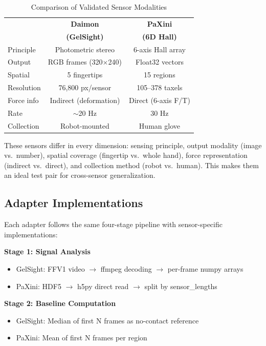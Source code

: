 \documentclass[conference]{IEEEtran}
\begin{document}
\begin{table}[t]
\centering
\caption{Comparison of Validated Sensor Modalities}
\label{tab:sensors}
\begin{tabular}{lcc}
\toprule
& \textbf{Daimon} & \textbf{PaXini} \\
& \textbf{(GelSight)} & \textbf{(6D Hall)} \\
\midrule
Principle & Photometric stereo & 6-axis Hall array \\
Output & RGB frames (320$\times$240) & Float32 vectors \\
Spatial & 5 fingertips & 15 regions \\
Resolution & 76,800 px/sensor & 105--378 taxels \\
Force info & Indirect (deformation) & Direct (6-axis F/T) \\
Rate & $\sim$20 Hz & 30 Hz \\
Collection & Robot-mounted & Human glove \\
\bottomrule
\end{tabular}
\end{table}

These sensors differ in every dimension: sensing principle, output modality (image vs.\ number), spatial coverage (fingertip vs.\ whole hand), force representation (indirect vs.\ direct), and collection method (robot vs.\ human). This makes them an ideal test pair for cross-sensor generalization.

\subsection{Adapter Implementations}

Each adapter follows the same four-stage pipeline with sensor-specific implementations:

\textbf{Stage 1: Signal Analysis}
\begin{itemize}
\item GelSight: FFV1 video $\rightarrow$ ffmpeg decoding $\rightarrow$ per-frame numpy arrays
\item PaXini: HDF5 $\rightarrow$ h5py direct read $\rightarrow$ split by sensor\_lengths
\end{itemize}

\textbf{Stage 2: Baseline Computation}
\begin{itemize}
\item GelSight: Median of first N frames as no-contact reference
\item PaXini: Mean of first N frames per region
\end{itemize}
\end{document}
